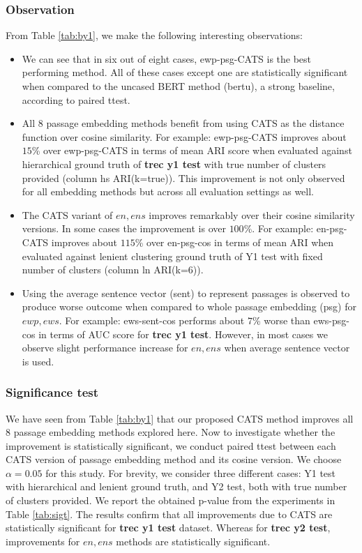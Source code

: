 \subsubsection{Observation} From Table \ref{tab:by1}, we make the following interesting observations:
\begin{itemize}[leftmargin=.15in]
    \item We can see that in six out of eight cases, ewp-psg-CATS is the best performing method. All of these cases except one are statistically significant when compared to the uncased BERT method (bertu), a strong baseline, according to paired ttest.
    \item All $8$ passage embedding methods benefit from using CATS as the distance function over cosine similarity. For example: ewp-psg-CATS improves about $15$\% over ewp-psg-CATS in terms of mean ARI score when evaluated against hierarchical ground truth of \textbf{trec y1 test} with true number of clusters provided (column hs ARI(k=true)). This improvement is not only observed for all embedding methods but across all evaluation settings as well.
    \item The CATS variant of $en, ens$ improves remarkably over their cosine similarity versions. In some cases the improvement is over $100$\%. For example: en-psg-CATS improves about $115$\% over en-psg-cos in terms of mean ARI when evaluated against lenient clustering ground truth of Y1 test with fixed number of clusters (column ln ARI(k=6)).
    \item Using the average sentence vector (sent) to represent passages is observed to produce worse outcome when compared to whole passage embedding (psg) for $ewp, ews$. For example: ews-sent-cos performs about $7$\% worse than ews-psg-cos in terms of AUC score for \textbf{trec y1 test}. However, in most cases we observe slight performance increase for $en, ens$ when average sentence vector is used.
\end{itemize}

\subsubsection{Significance test} We have seen from Table \ref{tab:by1} that our proposed CATS method improves all $8$ passage embedding methods explored here. Now to investigate whether the improvement is statistically significant, we conduct paired ttest between each CATS version of passage embedding method and its cosine version. We choose $\alpha = 0.05$ for this study. For brevity, we consider three different cases: Y1 test with hierarchical and lenient ground truth, and Y2 test, both with true number of clusters provided. We report the obtained p-value from the experiments in Table \ref{tab:sigt}. The results confirm that all improvements due to CATS are statistically significant for \textbf{trec y1 test} dataset. Whereas for \textbf{trec y2 test}, improvements for $en, ens$ methods are statistically significant.

